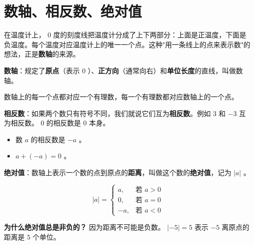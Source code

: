 \section*{数轴、相反数、绝对值}


\begin{explore}


在温度计上， $0$ 度的刻度线把温度计分成了上下两部分：上面是正温度，下面是负温度。每个温度对应温度计上的唯一一个点。这种"用一条线上的点来表示数"的想法，正是\textbf{数轴}的来源。

\end{explore}

\begin{understand}


\textbf{数轴}：规定了\textbf{原点}（表示 $0$ ）、\textbf{正方向}（通常向右）和\textbf{单位长度}的直线，叫做数轴。

数轴上的每一个点都对应一个有理数，每一个有理数都对应数轴上的一个点。

\textbf{相反数}：如果两个数只有符号不同，我们就说它们互为\textbf{相反数}。例如 $3$ 和 $-3$ 互为相反数。 $0$ 的相反数是 $0$ 本身。

\begin{itemize}
  \item 数 $a$ 的相反数是 $-a$ 。
  \item $a + (-a) = 0$ 。
\end{itemize}


\textbf{绝对值}：数轴上表示一个数的点到原点的\textbf{距离}，叫做这个数的\textbf{绝对值}，记为 $\lvert a \rvert$ 。

\[
\lvert a \rvert = \begin{cases} a, & \text{若 } a > 0 \\ 0, & \text{若 } a = 0 \\ -a, & \text{若 } a < 0 \end{cases}
\]


\textbf{为什么绝对值总是非负的？} 因为距离不可能是负数。 $\lvert -5 \rvert = 5$ 表示 $-5$ 离原点的距离是 $5$ 个单位。

\end{understand}

